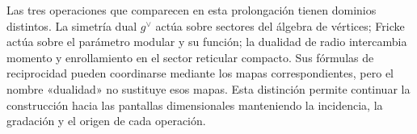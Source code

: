 Las tres operaciones que comparecen en esta prolongación tienen
dominios distintos. La simetría dual \(g^\vee\) actúa sobre sectores
del álgebra de vértices; Fricke actúa sobre el parámetro modular y
su función; la dualidad de radio intercambia momento y enrollamiento
en el sector reticular compacto. Sus fórmulas de reciprocidad pueden
coordinarse mediante los mapas correspondientes, pero el nombre
«dualidad» no sustituye esos mapas. Esta distinción permite continuar
la construcción hacia las pantallas dimensionales manteniendo la
incidencia, la gradación y el origen de cada operación.

